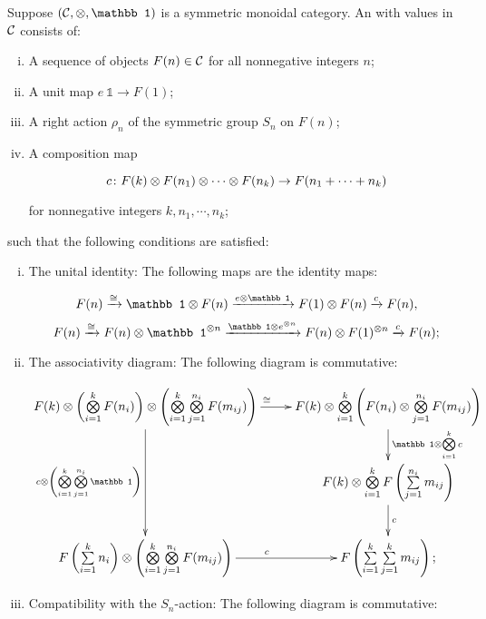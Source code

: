 \documentclass[twoside]{article}
\begin{document}
\begin{definition}
    Suppose $(\cal C,\ox,\mathbb1)$ is a symmetric monoidal category.
    An  with values in $\cal C$ consists of:
    \begin{enumerate}[i)]
        \item A sequence of objects $F(n)\in\cal C$ for all nonnegative integers $n$;
        \item A unit map $e\:\mathbb1\to F(1)$;
        \item A right action $\rho_n$ of the symmetric group $S_n$ on $F(n)$;
        \item A composition map 
        
        \[c\colon F(k)\otimes F(n_1)\otimes\cdots\otimes F(n_k)
        \to F(n_1+\cdots+n_k)\]
        
        for nonnegative integers $k,n_1,\cdots,n_k$;
    \end{enumerate}
    such that the following conditions are satisfied:
    \begin{enumerate}[i)]
        \item The unital identity: The following maps are the identity maps:
        
        \[F(n)\xrightarrow{\cong}\mathbb1\ox F(n)\xrightarrow{e\ox\mathbb1}
        F(1)\ox F(n)\xrightarrow{c}F(n),\]
        \[F(n)\xrightarrow{\cong}F(n)\ox\mathbb1^{\ox n}
        \xrightarrow{\mathbb1\ox e^{\ox n}}F(n)\ox F(1)^{\ox n}\xrightarrow{c}F(n);\]

        \item The associativity diagram: The following diagram is commutative:
        
        \begingroup
        \footnotesize
        \[\xymatrix{
        F(k)\ox\9\bigox_{i=1}^k F(n_i)\0\ox\9\bigox_{i=1}^k\bigox_{j=1}^{n_i}F(m_{ij})\0
        \ar[dd]_{c\ox\9\bigox_{i=1}^k\bigox_{j=1}^{n_i}\mathbb1\0}\ar[r]^\cong&
        F(k)\ox\bigox_{i=1}^k\9F(n_i)\ox\bigox_{j=1}^{n_i}F(m_{ij})\0
        \ar[d]^{\mathbb1\ox\bigox_{i=1}^kc}\\&
        F(k)\ox\bigox_{i=1}^kF\9\sum\limits_{j=1}^{n_i}m_{ij}\0\ar[d]^c\\
        F\9\sum\limits_{i=1}^kn_i\0\ox\9\bigox_{i=1}^k\bigox_{j=1}^{n_i}F(m_{ij})\0
        \ar[r]^c&F\9\sum\limits_{i=1}^k\sum\limits_{j=1}^km_{ij}\0;}\]
        \endgroup

        \item Compatibility with the $S_n$-action: The following diagram
        is commutative: 
        

\end{enumerate}
\end{definition}
\end{document}

